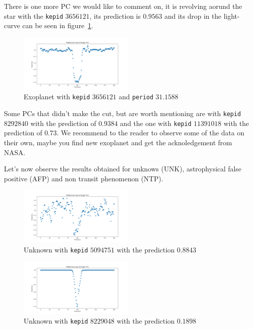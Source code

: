 \documentclass[twoside]{article}
\newcommand{\code}[1]{\texttt{#1}}
\begin{document}
\begin{multicols}{2}
There is one more PC we would like to comment on, it is revolving aorund the star with the \code{kepid} $3656121$, its prediction is $0.9563$ and its drop in the light-curve can be seen in figure~\ref{fig:resPC2}.
\begin{figure}[H]
\includegraphics[width=0.5\textwidth]{resPC2}
\caption{Exoplanet with \code{kepid} $3656121$ and \code{period} $31.1588$}
\label{fig:resPC2}
\end{figure}
Some PCs that didn't make the cut, but are worth mentioning are with \code{kepid} $8292840$ with the prediction of $0.9384$ and the one with \code{kepid} $11391018$ with the prediction of $0.73$. We recommend to the reader to observe some of the data on their own, maybe you find new exoplanet and get the acknoledgement from NASA. 

Let's now observe the results obtained for unknows (UNK), astrophysical false positive (AFP) and non transit phenomenon (NTP).  
\begin{figure}[H]
\includegraphics[width=0.5\textwidth]{resUNK1}
\caption{Unknown with \code{kepid} $5094751$ with the prediction $0.8843$}
\label{fig:resUNK1}
\end{figure}

\begin{figure}[H]
\includegraphics[width=0.5\textwidth]{resUNK2}
\caption{Unknown with \code{kepid} $8229048$ with the prediction $0.1898$}
\label{fig:resUNK2}
\end{figure}


\end{multicols}
\end{document}

